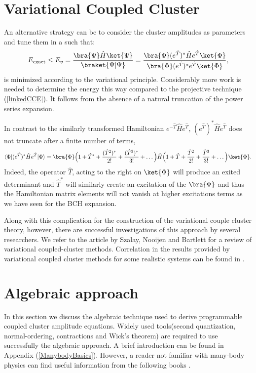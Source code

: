 \documentclass[twoside,english]{uiofysmaster}
\begin{document}
\section{Variational Coupled Cluster}

An alternative strategy can be to consider the cluster amplitudes as parameters and tune them in a such that:
\[
E_{\text{exact}} \le E_v = \frac{\bra{\Psi}\hat{H}\ket{\Psi}}{\braket{\Psi|\Psi}} =\frac{\bra{\Phi}(e^{\hat{T}})^*\hat{H}e^{\hat{T}}\ket{\Phi}}{\bra{\Phi}(e^{\hat{T}})^* e^{\hat{T}}\ket{\Phi}},
\]
is minimized according to the variational principle. Considerably more
work is needed to determine the energy this way compared to the
projective technique (\ref{linkedCCE}). It follows from the absence of
a natural truncation of the power series expansion.

In contrast to the similarly transformed Hamiltonian
$e^{-\hat{T}}\hat{H}e^{\hat{T}}$, $(e^{\hat{T}})^*\hat{H}e^{\hat{T}}$
does not truncate after a finite number of terms,
\[
\langle\Phi|(e^{\hat{T}})^*\hat{H}e^{\hat{T}}|\Phi\rangle = \bra{\Phi}\Big(1 + \hat{T}^* + \frac{(\hat{T}^2)^*}{2!} + \frac{(\hat{T}^3)^*}{3!} + \dots  \Big)\hat{H}\Big(1 + \hat{T} + \frac{\hat{T}^2}{2!} + \frac{\hat{T}^3}{3!} + \dots  \Big)\ket{\Phi}.
\]
Indeed, the operator $\hat{T}$, acting to the right on $\ket{\Phi}$
will produce an exited determinant and $\hat{T}^*$ will similarly
create an excitation of the $\bra{\Phi}$ and thus the Hamiltonian
matrix elements will not vanish at higher excitations terms as we have
seen for the BCH expansion.

Along with this complication for the construction of the variational
couple cluster theory, however, there are successful investigations of
this approach by several researchers. We refer to the article by
Szalay, Nooijen and Bartlett \cite{SzalayAlternativeansatzesingle1995}
for a review of variational coupled-cluster methods. Correlation in
the results provided by variational coupled cluster methods for some
realistic systems can be found in
\cite{EvangelistaAlternativesinglereferencecoupled2011}.


\section{Algebraic approach}

In this section we discuss the algebraic technique used to derive
programmable coupled cluster amplitude equations. Widely used
tools(second quantization, normal-ordering, contractions and Wick's
theorem) are required to use successfully the algebraic approach. A
brief introduction can be found in Appendix
(\ref{ManybodyBasics}). However, a  reader not familiar with many-body
physics can find useful information from the following books
\cite{HarrisAlgebraicdiagrammaticmethods1992,CrawfordIntroductionCoupledCluster2007, GrossManyparticletheory1991, SzaboModernQuantumChemistry1996,RaimesManyelectrontheory1972}.
\end{document}
